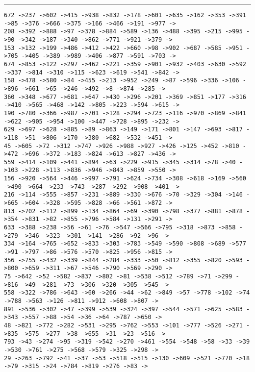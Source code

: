 \documentclass[letter, 12pt]{article}
\newenvironment{question}[1]{%
    \vspace{.2in}%
        \noindent{\bf #1}%
    \vspace{0.3em} \hrule \vspace{.1in}%
}{}
\begin{document}
\begin{question}{\large Appendix}
\begin{lstlisting}[style=CStyle]
672 ->237 ->602 ->415 ->938 ->832 ->178 ->601 ->635 ->162 ->353 ->391 ->85 ->376 ->666 ->375 ->166 ->466 ->191 ->977 ->
208 ->392 ->888 ->97 ->378 ->884 ->589 ->136 ->488 ->395 ->215 ->995 ->90 ->342 ->187 ->340 ->862 ->771 ->921 ->379 ->
153 ->132 ->199 ->486 ->412 ->422 ->660 ->98 ->902 ->687 ->585 ->951 ->705 ->405 ->389 ->989 ->406 ->877 ->591 ->703 ->
674 ->853 ->122 ->297 ->462 ->221 ->359 ->901 ->932 ->403 ->630 ->592 ->337 ->814 ->310 ->115 ->623 ->619 ->541 ->842 ->
158 ->478 ->580 ->84 ->455 ->213 ->952 ->249 ->87 ->596 ->336 ->106 ->896 ->661 ->65 ->246 ->492 ->8 ->874 ->285 ->
360 ->348 ->677 ->681 ->647 ->430 ->296 ->201 ->369 ->851 ->177 ->316 ->410 ->565 ->468 ->142 ->805 ->223 ->594 ->615 ->
190 ->780 ->366 ->987 ->701 ->128 ->294 ->723 ->116 ->970 ->869 ->841 ->622 ->905 ->954 ->100 ->447 ->728 ->895 ->232 ->
629 ->697 ->628 ->885 ->89 ->863 ->149 ->171 ->801 ->147 ->693 ->817 ->118 ->51 ->806 ->170 ->380 ->682 ->532 ->451 ->
45 ->605 ->72 ->312 ->747 ->926 ->988 ->927 ->426 ->125 ->452 ->810 ->472 ->696 ->372 ->183 ->824 ->613 ->827 ->436 ->
559 ->414 ->109 ->441 ->894 ->63 ->229 ->915 ->345 ->314 ->78 ->40 ->103 ->228 ->113 ->836 ->946 ->843 ->859 ->550 ->
156 ->920 ->564 ->446 ->997 ->791 ->624 ->734 ->308 ->618 ->169 ->560 ->490 ->664 ->233 ->743 ->287 ->292 ->908 ->401 ->
216 ->114 ->555 ->857 ->231 ->889 ->330 ->676 ->70 ->329 ->304 ->146 ->665 ->604 ->328 ->595 ->828 ->66 ->561 ->872 ->
813 ->702 ->112 ->899 ->134 ->864 ->69 ->390 ->798 ->377 ->881 ->878 ->354 ->831 ->82 ->855 ->796 ->584 ->131 ->291 ->
633 ->388 ->238 ->56 ->61 ->76 ->547 ->566 ->795 ->318 ->873 ->858 ->279 ->346 ->323 ->301 ->141 ->286 ->92 ->96 ->
334 ->164 ->765 ->652 ->833 ->303 ->783 ->549 ->590 ->808 ->689 ->577 ->91 ->797 ->86 ->576 ->570 ->825 ->956 ->815 ->
356 ->755 ->432 ->339 ->844 ->284 ->333 ->50 ->812 ->355 ->820 ->593 ->800 ->659 ->311 ->67 ->546 ->790 ->569 ->290 ->
75 ->642 ->52 ->582 ->837 ->802 ->81 ->538 ->512 ->789 ->71 ->299 ->816 ->49 ->281 ->73 ->306 ->320 ->305 ->545 ->
558 ->322 ->786 ->643 ->60 ->266 ->44 ->62 ->849 ->57 ->778 ->102 ->74 ->788 ->563 ->126 ->811 ->912 ->608 ->807 ->
891 ->536 ->302 ->47 ->399 ->539 ->324 ->397 ->544 ->571 ->625 ->583 ->343 ->557 ->88 ->54 ->36 ->64 ->787 ->650 ->
48 ->821 ->772 ->282 ->531 ->295 ->762 ->553 ->101 ->777 ->526 ->271 ->835 ->575 ->277 ->38 ->655 ->31 ->23 ->516 ->
793 ->43 ->274 ->95 ->319 ->542 ->270 ->461 ->554 ->548 ->58 ->33 ->39 ->530 ->761 ->275 ->568 ->579 ->325 ->298 ->
29 ->263 ->792 ->41 ->37 ->53 ->518 ->515 ->130 ->609 ->521 ->770 ->18 ->79 ->315 ->24 ->784 ->819 ->276 ->83 ->

\end{lstlisting}
\end{question}
\end{document}
